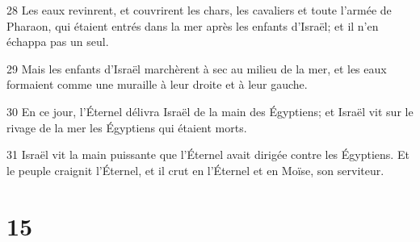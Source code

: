 \par 28 Les eaux revinrent, et couvrirent les chars, les cavaliers et toute l'armée de Pharaon, qui étaient entrés dans la mer après les enfants d'Israël; et il n'en échappa pas un seul.
\par 29 Mais les enfants d'Israël marchèrent à sec au milieu de la mer, et les eaux formaient comme une muraille à leur droite et à leur gauche.
\par 30 En ce jour, l'Éternel délivra Israël de la main des Égyptiens; et Israël vit sur le rivage de la mer les Égyptiens qui étaient morts.
\par 31 Israël vit la main puissante que l'Éternel avait dirigée contre les Égyptiens. Et le peuple craignit l'Éternel, et il crut en l'Éternel et en Moïse, son serviteur.

\chapter{15}

